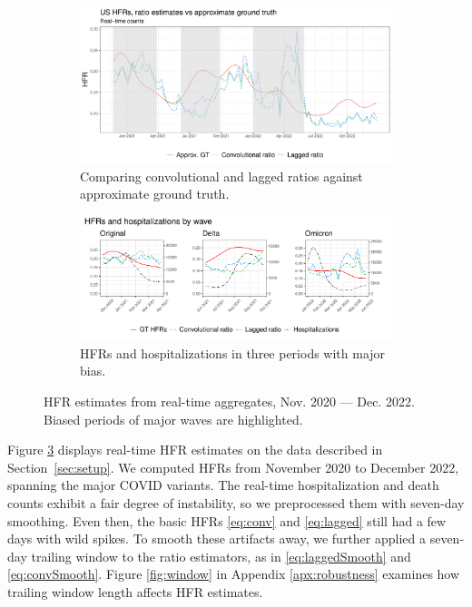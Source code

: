 \documentclass{article}
\begin{document}
\begin{figure}
     \centering
     \begin{subfigure}[b]{0.75\linewidth} %
         \centering
         \includegraphics[width=\linewidth]{Figures/Real/US_ests_realtime.pdf}
         \caption{Comparing convolutional and lagged ratios against approximate ground truth.}
         \vspace{10pt}
         \label{fig:basic_est_vs_gt}
     \end{subfigure}
     \begin{subfigure}[b]{\linewidth}%
         \centering
         \includegraphics[width=\linewidth]{Figures/Real/hfrs_by_wave.pdf}
         \caption{HFRs and hospitalizations in three periods with major bias.} 
         \label{fig:wave}
     \end{subfigure}
        \caption{HFR estimates from real-time aggregates, Nov. 2020 --- Dec. 2022. Biased periods of major waves are highlighted.}
        \label{fig:basic_est_vs_gt_figs}
\end{figure}

Figure \ref{fig:basic_est_vs_gt_figs} displays real-time HFR estimates on the data described in Section~\ref{sec:setup}. We computed HFRs from November 2020 to December 2022, spanning the major COVID variants. The real-time hospitalization and death counts exhibit a fair degree of instability, so we preprocessed them with seven-day smoothing. Even then, the basic HFRs \eqref{eq:conv} and \eqref{eq:lagged} still had a few days with wild spikes. To smooth these artifacts away, we further applied a seven-day trailing window to the ratio estimators, as in \eqref{eq:laggedSmooth} and \eqref{eq:convSmooth}. Figure \ref{fig:window} in Appendix \ref{apx:robustness} examines how trailing window length affects HFR estimates.
\end{document}
